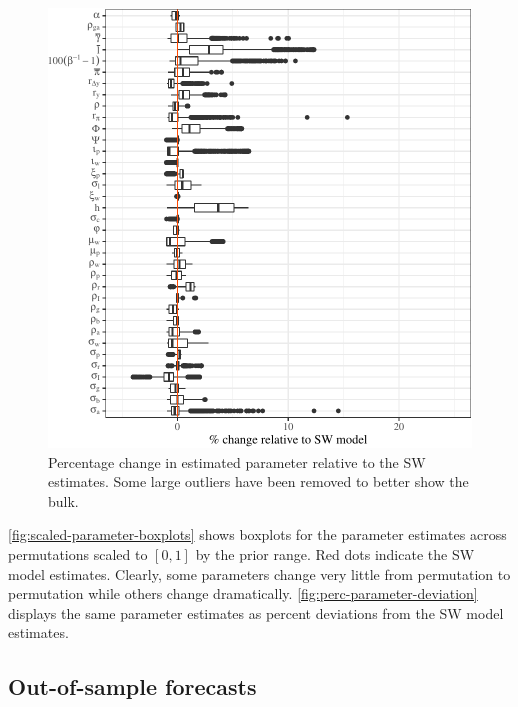 \documentclass[11pt]{article}
\begin{document}
\begin{figure}[t]

{\centering \includegraphics{gfx/perc-parameter-deviation-1} 

}

\caption{Percentage change in estimated parameter relative to the SW estimates. Some large outliers have been removed to better show the bulk.}\label{fig:perc-parameter-deviation}
\end{figure}

\autoref{fig:scaled-parameter-boxplots} shows boxplots for the parameter
estimates across permutations scaled to \([0,1]\) by the prior range.
Red dots indicate the SW model estimates. Clearly, some parameters
change very little from permutation to permutation while others change
dramatically. \autoref{fig:perc-parameter-deviation} displays the same
parameter estimates as percent deviations from the SW model estimates.

\hypertarget{out-of-sample-forecasts}{%
\subsection{Out-of-sample forecasts}\label{out-of-sample-forecasts}}
\end{document}
